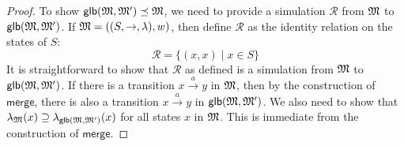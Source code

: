 \begin{proof}
To show $\mathsf{glb}(\frak{M}, \frak{M}') \preceq \frak{M}$, we need to provide a simulation $\mathcal{R}$ from $\frak{M}$ to  $\mathsf{glb}(\frak{M}, \frak{M}')$.
If $\frak{M} = ((S,\rightarrow,\lambda),w)$, then define $\mathcal{R}$ as the identity relation on the states of $S$:
\[
\mathcal{R} = \{(x,x) \; | \; x \in S\}
\]
It is straightforward to show that $\mathcal{R}$ as defined is a simulation from $\frak{M}$ to  $\mathsf{glb}(\frak{M}, \frak{M}')$.
If there is a transition $x \xrightarrow{a} y$ in $\frak{M}$, then by the construction of $\mathsf{merge}$, there is also a transition $x \xrightarrow{a} y$ in $\mathsf{glb}(\frak{M}, \frak{M}')$.
We also need to show that $\lambda_{\frak{M}}(x) \supseteq \lambda_{\mathsf{glb}(\frak{M}, \frak{M}')}(x)$ for all states $x$ in $\frak{M}$. This is immediate from the construction of $\mathsf{merge}$.

\end{proof}

